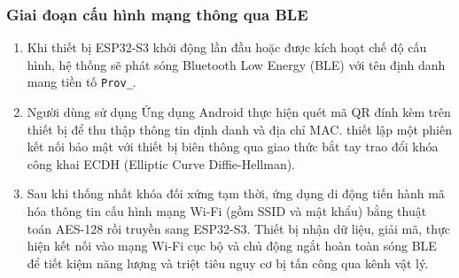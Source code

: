 \documentclass[a4paper,13pt,3p,oneside]{report}
\begin{document}
\subsubsection{Giai đoạn cấu hình mạng thông qua BLE}
\begin{enumerate}
    \item Khi thiết bị ESP32-S3 khởi động lần đầu hoặc được kích hoạt chế độ cấu hình, hệ thống sẽ phát sóng Bluetooth Low Energy (BLE) với tên định danh mang tiền tố \texttt{Prov\_}.
    \item Người dùng sử dụng Ứng dụng Android thực hiện quét mã QR đính kèm trên thiết bị để thu thập thông tin định danh và địa chỉ MAC. 
     thiết lập một phiên kết nối bảo mật với thiết bị biên thông qua giao thức bắt tay trao đổi khóa công khai ECDH (Elliptic Curve Diffie-Hellman).
    \item Sau khi thống nhất khóa đối xứng tạm thời, ứng dụng di động tiến hành mã hóa thông tin cấu hình mạng Wi-Fi (gồm SSID và mật khẩu) bằng thuật toán AES-128 rồi truyền sang ESP32-S3. Thiết bị nhận dữ liệu, giải mã, thực hiện kết nối vào mạng Wi-Fi cục bộ và chủ động ngắt hoàn toàn sóng BLE để tiết kiệm năng lượng và triệt tiêu nguy cơ bị tấn công qua kênh vật lý.
\end{enumerate}
\end{document}
